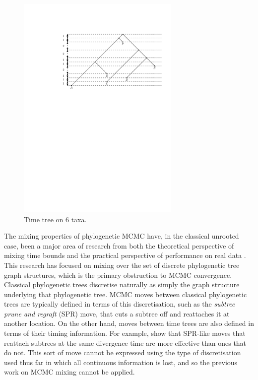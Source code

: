 \documentclass{amsart}
\begin{document}
\begin{figure}
\centering
\includegraphics[width=0.7\textwidth]{T5.pdf}
\caption{Time tree on $6$ taxa.}
\label{T5.pdf}
\end{figure}

The mixing properties of phylogenetic MCMC have, in the classical unrooted case, been a major area of research from both the theoretical perspective of mixing time bounds \autocite{Mossel2005-ly,Mossel2006-fo,Stefankovic2011-hu,spade2014note} and the practical perspective of performance on real data \autocite{beiko2006searching,Ronquist2006-fv,lakner2008efficiency,Whidden2015-yi}.
This research has focused on mixing over the set of discrete phylogenetic tree graph structures, which is the primary obstruction to MCMC convergence.
Classical phylogenetic trees discretise naturally as simply the graph structure underlying that phylogenetic tree.
MCMC moves between classical phylogenetic trees are typically defined in terms of this discretisation, such as the \emph{subtree prune and regraft} (SPR) move, that cuts a subtree off and reattaches it at another location.
On the other hand, moves between time trees are also defined in terms of their timing information.
For example, \textcite{Hohna2008-vl} show that SPR-like moves that reattach subtrees at the same divergence time are more effective than ones that do not.
This sort of move cannot be expressed using the type of discretisation used thus far in which all continuous information is lost, and so the previous work on MCMC mixing cannot be applied.
\end{document}
